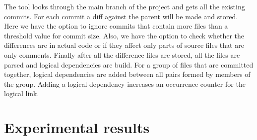 \documentclass[a4paper,twoside]{article}
\begin{document}
The tool looks through the main branch of the project and gets all the existing commits. For each commit a diff against the parent will be made and stored. Here we have the option to ignore commits that contain more files than a threshold value for commit size. Also, we have the option to check whether the differences are in actual code or if they affect only parts of source files that are only comments.  Finally after all the difference files are stored, all the files are parsed and logical dependencies are build. For a group of files that are committed together, logical dependencies are added between all pairs formed by members of the group. Adding a logical dependency increases an occurrence counter for the logical link. 

\section{Experimental results}
\label{sec:experiments}
\end{document}
